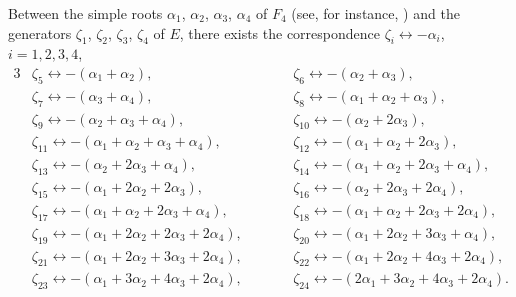 \begin{Remark}\label{correspondence-generators-roots}
Between the simple roots $\alpha_1$, $\alpha_2$, $\alpha_3$, $\alpha_4$ of $F_4$ (see, for instance, \cite{Bourbaki}) and
the generators $\zeta_1$, $\zeta_2$, $\zeta_3$, $\zeta_4$ of $E$, there exists the correspondence
$\zeta_i \longleftrightarrow -\alpha_i$, $i = 1, 2, 3, 4$,
\begin{alignat*}{3}
&\zeta_5 \longleftrightarrow - (\alpha_1 + \alpha_2), \qquad&&
\zeta_6 \longleftrightarrow -(\alpha_2 + \alpha_3), & \\
&\zeta_7 \longleftrightarrow -(\alpha_3 + \alpha_4), \qquad&&
\zeta_8 \longleftrightarrow -(\alpha_1 + \alpha_2 + \alpha_3), \\
&\zeta_9 \longleftrightarrow -(\alpha_2 + \alpha_3 + \alpha_4), \qquad&&
\zeta_{10} \longleftrightarrow -(\alpha_2 + 2\alpha_3), \\
&\zeta_{11} \longleftrightarrow -(\alpha_1 + \alpha_2 + \alpha_3 + \alpha_4), \qquad&&
\zeta_{12} \longleftrightarrow -(\alpha_1 + \alpha_2 + 2\alpha_3), \\
&\zeta_{13} \longleftrightarrow -(\alpha_2 + 2\alpha_3 + \alpha_4), \qquad&&
\zeta_{14} \longleftrightarrow -(\alpha_1 + \alpha_2 + 2\alpha_3 + \alpha_4), \\
&\zeta_{15} \longleftrightarrow -(\alpha_1 + 2\alpha_2 + 2\alpha_3), \qquad&&
\zeta_{16} \longleftrightarrow -(\alpha_2 + 2\alpha_3 + 2\alpha_4), \\
&\zeta_{17} \longleftrightarrow -(\alpha_1 + \alpha_2 + 2\alpha_3 + \alpha_4), \qquad&&
\zeta_{18} \longleftrightarrow -(\alpha_1 + \alpha_2 + 2\alpha_3 + 2\alpha_4), \\
&\zeta_{19} \longleftrightarrow -(\alpha_1 + 2\alpha_2 + 2\alpha_3 + 2\alpha_4), \qquad&&
\zeta_{20} \longleftrightarrow -(\alpha_1 + 2\alpha_2 + 3\alpha_3 + \alpha_4), \\
&\zeta_{21} \longleftrightarrow -(\alpha_1 + 2\alpha_2 + 3\alpha_3 + 2\alpha_4), \qquad&&
\zeta_{22} \longleftrightarrow -(\alpha_1 + 2\alpha_2 + 4\alpha_3 + 2\alpha_4),\\
&\zeta_{23} \longleftrightarrow -(\alpha_1 + 3\alpha_2 + 4\alpha_3 + 2\alpha_4), \qquad&&
\zeta_{24} \longleftrightarrow -(2\alpha_1 + 3\alpha_2 + 4\alpha_3 + 2\alpha_4).
\end{alignat*}
\end{Remark}


